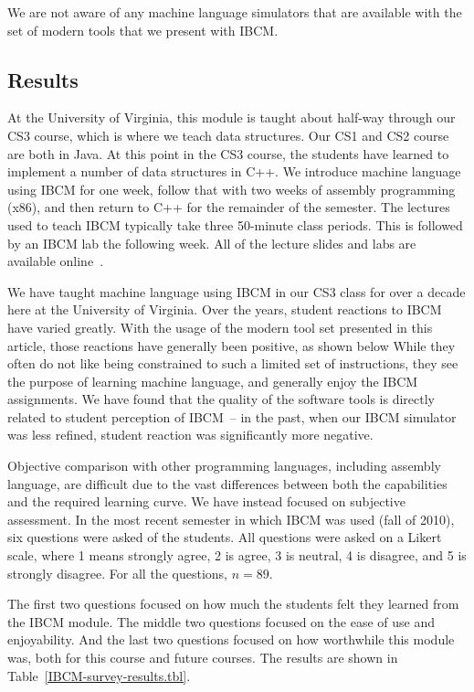 We are not aware of any machine language simulators that are available
with the set of modern tools that we present with IBCM.


\subsection{Results}

At the University of Virginia, this module is taught about half-way
through our CS3 course, which is where we teach data structures.  Our
CS1 and CS2 course are both in Java.  At this point in the CS3 course,
the students have learned to implement a number of data structures in
C++.  We introduce machine language using IBCM for one week, follow
that with two weeks of assembly programming (x86), and then return to
C++ for the remainder of the semester.  The lectures used to teach
IBCM typically take three 50-minute class periods.  This is followed
by an IBCM lab the following week.  All of the lecture slides and labs
are available online~\cite{ibcm-website}.

We have taught machine language using IBCM in our CS3 class for over a
decade here at the University of Virginia.  Over the years, student
reactions to IBCM have varied greatly.  With the usage of the modern
tool set presented in this article, those reactions have generally
been positive, as shown below While they often do not like being
constrained to such a limited set of instructions, they see the
purpose of learning machine language, and generally enjoy the IBCM
assignments.  We have found that the quality of the software tools is
directly related to student perception of IBCM~-- in the past, when
our IBCM simulator was less refined, student reaction was
significantly more negative.

Objective comparison with other programming languages, including
assembly language, are difficult due to the vast differences between
both the capabilities and the required learning curve.  We have
instead focused on subjective assessment.  In the most recent semester
in which IBCM was used (fall of 2010), six questions were asked of the
students.  All questions were asked on a Likert scale, where 1 means
strongly agree, 2 is agree, 3 is neutral, 4 is disagree, and 5 is
strongly disagree.  For all the questions, $n=89$.

The first two questions focused on how much the students felt they
learned from the IBCM module.  The middle two questions focused on the
ease of use and enjoyability.  And the last two questions focused on
how worthwhile this module was, both for this course and future courses.
The results are shown in Table~\ref{IBCM-survey-results.tbl}.

